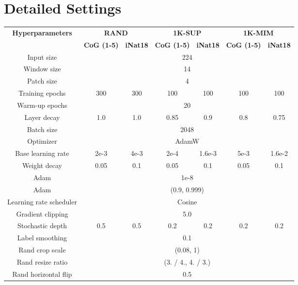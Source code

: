 \documentclass{article}
\begin{document}
\section{Detailed Settings}
\label{sec:exp-detail}


\begin{table}[h]\small
    \centering \begin{tabular}{c|cccccc}
    \toprule
    \multirow{2}{*}{\textbf{Hyperparameters}} 
    & \multicolumn{2}{c}{\textbf{RAND}}
    & \multicolumn{2}{c}{\textbf{1K-SUP}} & \multicolumn{2}{c}{\textbf{1K-MIM}}
    \\
    & \textbf{CoG (1-5)} & \textbf{iNat18} 
    & \textbf{CoG (1-5)} & \textbf{iNat18}
    & \textbf{CoG (1-5)} & \textbf{iNat18}
    \\
    \hline
    Input size & \multicolumn{6}{c}{224}
    \\
    Window size & \multicolumn{6}{c}{14}\\
    Patch size & \multicolumn{6}{c}{4}\\
    \hline
    Training epochs
    & 300 & 300 & 100 & 100& 100& 100
    \\
    Warm-up epochs & \multicolumn{6}{c}{20}\\
    Layer decay & 1.0 & 1.0 & 0.85 & 0.9 & 0.8 & 0.75 \\
    Batch size & \multicolumn{6}{c}{2048}     \\
    Optimizer & \multicolumn{6}{c}{AdamW}     \\
    Base learning rate & 2e-3 & 4e-3 & 2e-4 & 1.6e-3 & 5e-3 & 1.6e-2 \\
    Weight decay & 0.05 & 0.1 & 0.05 & 0.1 & 0.05 & 0.1 \\
    Adam  & \multicolumn{6}{c}{1e-8}\\
    Adam  & \multicolumn{6}{c}{(0.9, 0.999)}\\
    Learning rate scheduler & \multicolumn{6}{c}{Cosine}\\
    \hline
    Gradient clipping & \multicolumn{6}{c}{5.0}\\
    Stochastic depth & 0.5 & 0.5 & 0.2 & 0.2 & 0.2 & 0.2 \\
    Label smoothing & \multicolumn{6}{c}{0.1}\\
    \hline
    Rand crop scale & \multicolumn{6}{c}{(0.08, 1)} \\
    Rand resize ratio & \multicolumn{6}{c}{(3. / 4., 4. / 3.)} \\
    Rand horizontal flip & \multicolumn{6}{c}{0.5} \\

\end{tabular}
\end{table}
\end{document}
